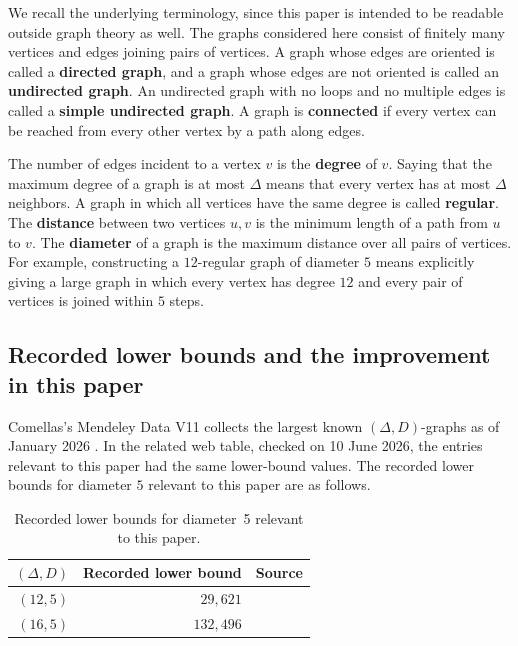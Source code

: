 \documentclass[11pt]{article}
\theoremstyle{definition}
\theoremstyle{remark}
\renewcommand{\_}{\textunderscore\allowbreak}
\begin{document}
We recall the underlying terminology, since this paper is intended to be
readable outside graph theory as well. The graphs considered here consist
of finitely many vertices and edges joining pairs of vertices.
 A graph whose edges are oriented is
called a \textbf{directed graph}, and a graph whose edges are not
oriented is called an \textbf{undirected graph}. An undirected graph
with no loops and no multiple edges is called a \textbf{simple
undirected graph}. A graph is \textbf{connected} if every vertex can be
reached from every other vertex by a path along edges.

The number of edges incident to a vertex \(v\) is the \textbf{degree} of
\(v\). Saying that the maximum degree of a graph is at most \(\Delta\)
means that every vertex has at most \(\Delta\) neighbors. A graph in
which all vertices have the same degree is called \textbf{regular}. The
\textbf{distance} between two vertices \(u,v\) is the minimum length of
a path from \(u\) to \(v\). The \textbf{diameter} of a graph is the
maximum distance over all pairs of vertices.
For example, constructing a \(12\)-regular graph of diameter \(5\) means
explicitly giving a large graph in which every vertex has degree \(12\)
and every pair of vertices is joined within \(5\) steps.

\subsection{Recorded lower bounds and the improvement in this
paper}\label{recorded-lower-bounds-and-the-improvement-in-this-paper}

Comellas's Mendeley Data V11 collects the largest known
\((\Delta,D)\)-graphs as of January 2026 \cite{Comellas2026,
ComellasData2026}. In the related web table, checked on 10 June 2026,
the entries relevant to this paper had the same lower-bound values. The
recorded lower bounds for diameter \(5\) relevant to this paper are as
follows.

\begin{table}[ht]
\centering
\caption{Recorded lower bounds for diameter~5 relevant to this paper.}
\label{tab:records}
\begin{tabular}{rrl}
\toprule
\((\Delta,D)\) & Recorded lower bound & Source \\
\midrule
\((12,5)\) & \(29{,}621\) & \cite{Comellas2025} \\
\midrule
\((16,5)\) & \(132{,}496\) & \cite{DelormeBipartite1985} \\
\bottomrule
\end{tabular}
\end{table}
\end{document}
